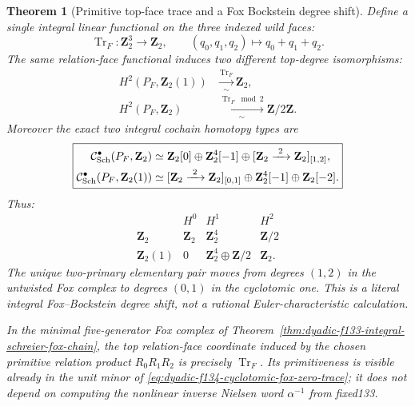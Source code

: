\documentclass[11pt]{article}
\newtheorem{theorem}{Theorem}[section]
\theoremstyle{definition}
\begin{document}
\begin{theorem}[Primitive top-face trace and a Fox Bockstein degree shift]
\label{thm:dyadic-f134-top-trace-bockstein-shift}
Define a single
integral linear
functional on the
three indexed
wild faces:
\begin{equation}\label{eq:dyadic-f134-primitive-top-functional}
\boxed{\qquad
\operatorname{Tr}_F:
\mathbf Z_2^3\longrightarrow\mathbf Z_2,
\qquad
(q_0,q_1,q_2)\longmapsto q_0+q_1+q_2.
\qquad}
\end{equation}
The same relation-face
functional induces
two different
top-degree isomorphisms:
\begin{equation}\label{eq:dyadic-f134-top-class-identifications}
\boxed{
\begin{aligned}
H^2(P_F,\mathbf Z_2(1))
&\xrightarrow[\sim]{\operatorname{Tr}_F}
\mathbf Z_2,\\
H^2(P_F,\mathbf Z_2)
&\xrightarrow[\sim]{\operatorname{Tr}_F\bmod2}
\mathbf Z/2\mathbf Z.
\end{aligned}}
\end{equation}
Moreover the
\emph{exact} two
integral cochain
homotopy types are
\begin{equation}\label{eq:dyadic-f134-twisted-untwisted-normal-forms}
\boxed{
\begin{aligned}
\mathcal C_{\rm Sch}^\bullet(P_F,\mathbf Z_2)
\simeq{}&
\mathbf Z_2[0]\oplus
\mathbf Z_2^4[-1]\oplus
[\mathbf Z_2\xrightarrow{\ 2\ }
 \mathbf Z_2]_{[1,2]},\\
\mathcal C_{\rm Sch}^\bullet(P_F,\mathbf Z_2(1))
\simeq{}&
[\mathbf Z_2\xrightarrow{\ 2\ }
 \mathbf Z_2]_{[0,1]}
\oplus\mathbf Z_2^4[-1]
\oplus\mathbf Z_2[-2].
\end{aligned}}
\end{equation}
Thus:
\begin{equation}\label{eq:dyadic-f134-h0h1h2-explicit}
\boxed{
\begin{array}{c|ccc}
&H^0&H^1&H^2\\ \hline
\mathbf Z_2&
\mathbf Z_2&
\mathbf Z_2^4&
\mathbf Z/2\\
\mathbf Z_2(1)&
0&
\mathbf Z_2^4\oplus\mathbf Z/2&
\mathbf Z_2 .
\end{array}}
\end{equation}
The unique two-primary
elementary pair
moves from
degrees $(1,2)$
in the untwisted
Fox complex to
degrees $(0,1)$
in the cyclotomic
one.  This is a
literal integral
Fox--Bockstein
\emph{degree shift},
not a rational
Euler-characteristic
calculation.

In the minimal
five-generator Fox
complex of
Theorem~\ref{thm:dyadic-f133-integral-schreier-fox-chain},
the top relation-face
coordinate induced by
the chosen primitive
relation product
$R_0R_1R_2$ is
precisely
$\operatorname{Tr}_F$.
Its primitiveness is
visible already
in the unit minor
of
\eqref{eq:dyadic-f134-cyclotomic-fox-zero-trace};
it does not depend
on computing the
nonlinear inverse
Nielsen word
$\alpha^{-1}$
from fixed133.
\end{theorem}
\end{document}

